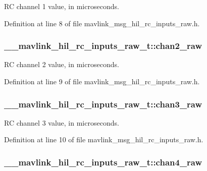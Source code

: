 R\-C channel 1 value, in microseconds. 



Definition at line 8 of file mavlink\-\_\-msg\-\_\-hil\-\_\-rc\-\_\-inputs\-\_\-raw.\-h.

\hypertarget{struct____mavlink__hil__rc__inputs__raw__t_a0210c7a3752c816e694c38e9fa85b8ed}{
\subsubsection[{chan2\-\_\-raw}]{ \-\_\-\-\_\-mavlink\-\_\-hil\-\_\-rc\-\_\-inputs\-\_\-raw\-\_\-t\-::chan2\-\_\-raw}}\label{struct____mavlink__hil__rc__inputs__raw__t_a0210c7a3752c816e694c38e9fa85b8ed}


R\-C channel 2 value, in microseconds. 



Definition at line 9 of file mavlink\-\_\-msg\-\_\-hil\-\_\-rc\-\_\-inputs\-\_\-raw.\-h.

\hypertarget{struct____mavlink__hil__rc__inputs__raw__t_a4f05c2ed52ec8aed527bc31331f74247}{
\subsubsection[{chan3\-\_\-raw}]{ \-\_\-\-\_\-mavlink\-\_\-hil\-\_\-rc\-\_\-inputs\-\_\-raw\-\_\-t\-::chan3\-\_\-raw}}\label{struct____mavlink__hil__rc__inputs__raw__t_a4f05c2ed52ec8aed527bc31331f74247}


R\-C channel 3 value, in microseconds. 



Definition at line 10 of file mavlink\-\_\-msg\-\_\-hil\-\_\-rc\-\_\-inputs\-\_\-raw.\-h.

\hypertarget{struct____mavlink__hil__rc__inputs__raw__t_a762888a4e5d0273d9042bd1924c8b95b}{
\subsubsection[{chan4\-\_\-raw}]{ \-\_\-\-\_\-mavlink\-\_\-hil\-\_\-rc\-\_\-inputs\-\_\-raw\-\_\-t\-::chan4\-\_\-raw}}\label{struct____mavlink__hil__rc__inputs__raw__t_a762888a4e5d0273d9042bd1924c8b95b}


